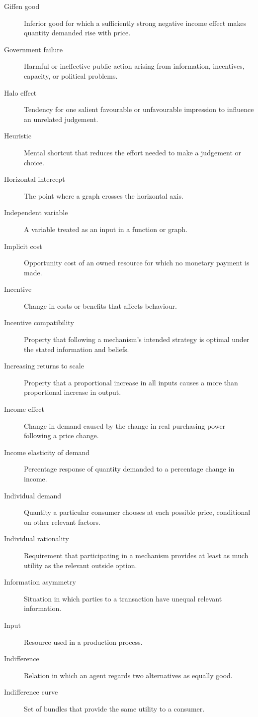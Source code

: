 \begin{description}
  \item[Giffen good] Inferior good for which a sufficiently strong negative income effect makes quantity demanded rise with price.
  \item[Government failure] Harmful or ineffective public action arising from information, incentives, capacity, or political problems.
  \item[Halo effect] Tendency for one salient favourable or unfavourable impression to influence an unrelated judgement.
  \item[Heuristic] Mental shortcut that reduces the effort needed to make a judgement or choice.
  \item[Horizontal intercept] The point where a graph crosses the horizontal axis.
  \item[Independent variable] A variable treated as an input in a function or graph.
  \item[Implicit cost] Opportunity cost of an owned resource for which no monetary payment is made.
  \item[Incentive] Change in costs or benefits that affects behaviour.
  \item[Incentive compatibility] Property that following a mechanism's
  intended strategy is optimal under the stated information and beliefs.
  \item[Increasing returns to scale] Property that a proportional increase in all inputs causes a more than proportional increase in output.
  \item[Income effect] Change in demand caused by the change in real purchasing power following a price change.
  \item[Income elasticity of demand] Percentage response of quantity demanded to a percentage change in income.
  \item[Individual demand] Quantity a particular consumer chooses at each possible price, conditional on other relevant factors.
  \item[Individual rationality] Requirement that participating in a mechanism provides at least as much utility as the relevant outside option.
  \item[Information asymmetry] Situation in which parties to a transaction have unequal relevant information.
  \item[Input] Resource used in a production process.
  \item[Indifference] Relation in which an agent regards two alternatives as equally good.
  \item[Indifference curve] Set of bundles that provide the same utility to a consumer.

\end{description}
